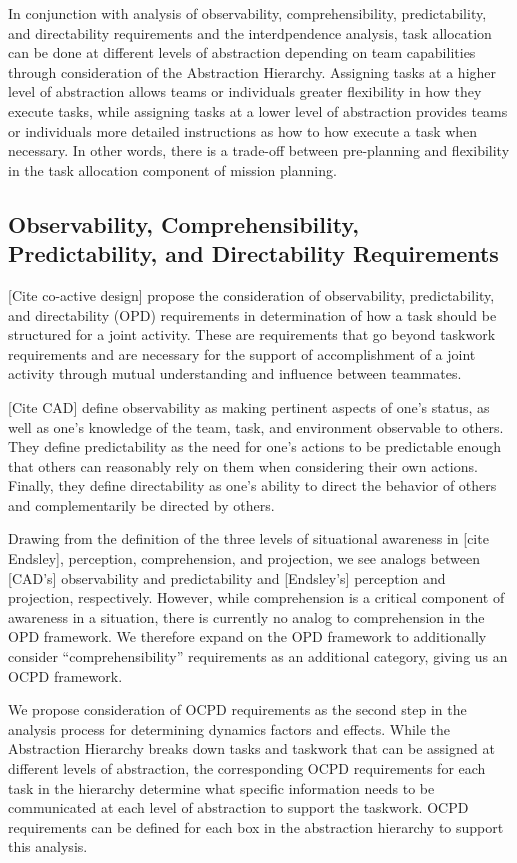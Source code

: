 \documentclass[letterpaper, 10 pt, conference]{ieeeconf}  %
\theoremstyle{definition}
\begin{document}
In conjunction with analysis of observability, comprehensibility, predictability, and directability requirements and the interdpendence analysis, task allocation can be done at different levels of abstraction depending on team capabilities through consideration of the Abstraction Hierarchy. Assigning tasks at a higher level of abstraction allows teams or individuals greater flexibility in how they execute tasks, while assigning tasks at a lower level of abstraction provides teams or individuals more detailed instructions as how to how execute a task when necessary. In other words, there is a trade-off between pre-planning and flexibility in the task allocation component of mission planning.

\subsection{Observability, Comprehensibility, Predictability, and Directability Requirements}
[Cite co-active design] propose the consideration of observability, predictability, and directability (OPD) requirements in determination of how a task should be structured for a joint activity. These are requirements that go beyond taskwork requirements and are necessary for the support of accomplishment of a joint activity through mutual understanding and influence between teammates. 

[Cite CAD] define observability as making pertinent aspects of one’s status, as well as one’s knowledge of the team, task, and environment observable to others. They define predictability as the need for one’s actions to be predictable enough that others can reasonably rely on them when considering their own actions. Finally, they define directability as one’s ability to direct the behavior of others and complementarily be directed by others. 

Drawing from the definition of the three levels of situational awareness in [cite Endsley], perception, comprehension, and projection, we see analogs between [CAD's] observability and predictability and [Endsley's] perception and projection, respectively. However, while comprehension is a critical component of awareness in a situation, there is currently no analog to comprehension in the OPD framework. We therefore expand on the OPD framework to additionally consider ``comprehensibility'' requirements as an additional category, giving us an OCPD framework.

We propose consideration of OCPD requirements as the second step in the analysis process for determining dynamics factors and effects. While the Abstraction Hierarchy breaks down tasks and taskwork that can be assigned at different levels of abstraction, the corresponding OCPD requirements for each task in the hierarchy determine what specific information needs to be communicated at each level of abstraction to support the taskwork. OCPD requirements can be defined for each box in the abstraction hierarchy to support this analysis.
\end{document}
